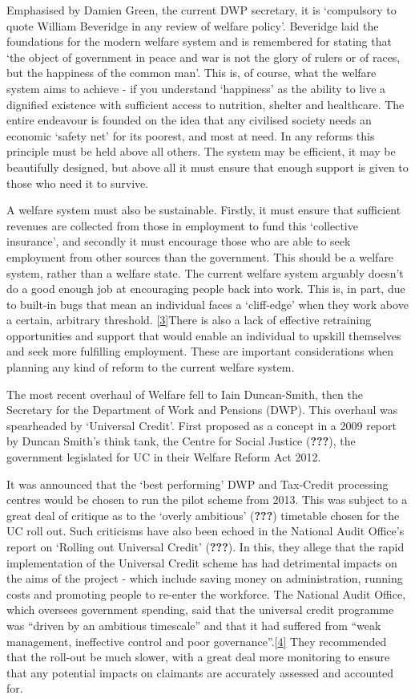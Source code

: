 \documentclass[]{tufte-handout}
\begin{document}
Emphasised by Damien Green, the current DWP secretary, it is `compulsory
to quote William Beveridge in any review of welfare policy'. Beveridge
laid the foundations for the modern welfare system and is remembered for
stating that `the object of government in peace and war is not the glory
of rulers or of races, but the happiness of the common man'. This is, of
course, what the welfare system aims to achieve - if you understand
`happiness' as the ability to live a dignified existence with sufficient
access to nutrition, shelter and healthcare. The entire endeavour is
founded on the idea that any civilised society needs an economic `safety
net' for its poorest, and most at need. In any reforms this principle
must be held above all others. The system may be efficient, it may be
beautifully designed, but above all it must ensure that enough support
is given to those who need it to survive.

A welfare system must also be sustainable. Firstly, it must ensure that
sufficient revenues are collected from those in employment to fund this
`collective insurance', and secondly it must encourage those who are
able to seek employment from other sources than the government. This
should be a welfare system, rather than a welfare state. The current
welfare system arguably doesn't do a good enough job at encouraging
people back into work. This is, in part, due to built-in bugs that mean
an individual faces a `cliff-edge' when they work above a certain,
arbitrary threshold. {[}\protect\hyperlink{_ftn3}{3{]}}There is also a
lack of effective retraining opportunities and support that would enable
an individual to upskill themselves and seek more fulfilling employment.
These are important considerations when planning any kind of reform to
the current welfare system.

The most recent overhaul of Welfare fell to Iain Duncan-Smith, then the
Secretary for the Department of Work and Pensions (DWP). This overhaul
was spearheaded by `Universal Credit'. First proposed as a concept in a
2009 report by Duncan Smith's think tank, the Centre for Social Justice
({\textbf{???}}), the government legislated for UC in their Welfare
Reform Act 2012.

It was announced that the `best performing' DWP and Tax-Credit
processing centres would be chosen to run the pilot scheme from 2013.
This was subject to a great deal of critique as to the `overly
ambitious' ({\textbf{???}}) timetable chosen for the UC roll out. Such
criticisms have also been echoed in the National Audit Office's report
on `Rolling out Universal Credit' ({\textbf{???}}). In this, they allege
that the rapid implementation of the Universal Credit scheme has had
detrimental impacts on the aims of the project - which include saving
money on administration, running costs and promoting people to re-enter
the workforce. The National Audit Office, which oversees government
spending, said that the universal credit programme was ``driven by an
ambitious timescale'' and that it had suffered from ``weak management,
ineffective control and poor
governance''.{[}\protect\hyperlink{_ftn4}{4{]}} They recommended that
the roll-out be much slower, with a great deal more monitoring to ensure
that any potential impacts on claimants are accurately assessed and
accounted for.
\end{document}
